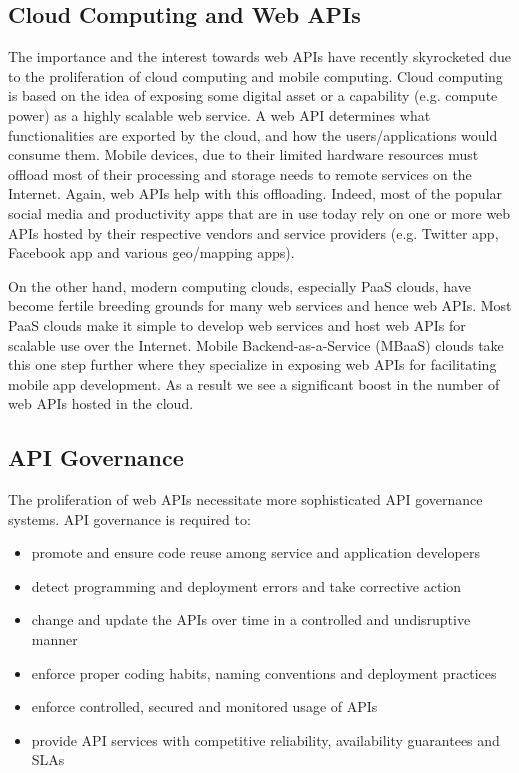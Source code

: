 \subsection{Cloud Computing and Web APIs}
The importance and the interest towards web APIs have recently skyrocketed due to the proliferation of cloud computing and mobile computing.
Cloud computing is based on the idea of exposing some digital asset or a capability (e.g. compute power) as a highly scalable web service. A 
web API determines
what functionalities are exported by the cloud, and how the users/applications would consume them. Mobile devices, due to their limited hardware
resources must offload most of their processing and storage needs to remote services on the Internet. Again, web APIs help with this offloading. 
Indeed, most of the popular social media and productivity apps
that are in use today rely on one or more web APIs hosted by their respective vendors and service providers (e.g. Twitter app, Facebook app and 
various geo/mapping apps).

On the other hand, modern computing clouds, especially PaaS clouds, have become fertile breeding grounds for many web services and hence 
web APIs. Most PaaS clouds make it simple to develop web services and host web APIs for scalable use over the Internet. Mobile 
Backend-as-a-Service (MBaaS) clouds take this one step further where they specialize in exposing web APIs for facilitating mobile
app development. As a result we see a significant boost in the number of web APIs hosted in the cloud.

\subsection{API Governance}
The proliferation of web APIs necessitate more sophisticated API governance systems. API governance is required to:
\begin{itemize}
\item promote and ensure code reuse among service and application developers
\item detect programming and deployment errors and take corrective action
\item change and update the APIs over time in a controlled and undisruptive manner
\item enforce proper coding habits, naming conventions and deployment practices
\item enforce controlled, secured and monitored usage of APIs
\item provide API services with competitive reliability, availability guarantees and SLAs
\end{itemize}


